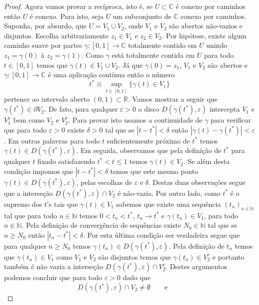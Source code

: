 \begin{proof}
\medskip 
Agora vamos provar a recíproca, isto é, se $U\subset \mathbb{C}$ é conexo 
por caminhos então $U$ é conexo. 
Para isto, seja $U$ um subconjunto de $\mathbb{C}$ conexo por caminhos.  
Suponha, por absurdo, que $U=V_1\cup V_2$, onde $V_1$ e $V_2$ são 
abertos não-vazios e disjuntos. Escolha arbitrariamente $z_1\in V_1$ e $z_2\in V_2$. 
Por hipótese, existe algum caminho suave por partes $\gamma:[0,1]\to\mathbb{C}$ totalmente
contido em $U$ unindo $z_1=\gamma(0)$ à $z_2=\gamma(1)$.
Como $\gamma$ está totalmente contida em $U$ para todo $t\in [0,1]$ temos que
$\gamma(t)\in V_1\cup V_2$. Já que $\gamma(0)=z_1$, $V_1$ e $V_2$ são abertos e $\gamma:[0,1]\to\mathbb{C}$
é uma aplicação contínua então 
o número 
\[ 
t^* \equiv \sup_{t\in [0,1]}\{ \gamma(t)\in V_1\}
\]
pertence ao intervalo aberto $(0,1)\subset\mathbb{R}$.
Vamos mostrar a seguir que $\gamma(t^*)\in \partial V_2$.
De fato, para qualquer $\varepsilon>0$ o disco $D(\gamma(t^*),\varepsilon)$
intercepta $V_1$ e $V_1^c$ bem como $V_2$ e $V_2^c$. Para provar isto  usamos a continuidade de 
$\gamma$ para verificar que para todo $\varepsilon>0$ existe $\delta>0$
tal que se $|t-t^{*}|<\delta$ então $|\gamma(t)-\gamma(t^*)|<\varepsilon$. Em outras palavras
para todo $t$ suficientemente próximo de $t^{*}$ temos $\gamma(t)\in D(\gamma(t^*),\varepsilon)$.
Em seguida, observamos que pela definição de $t^*$ para qualquer $t$ fixado satisfazendo
$t^{*}<t\leqslant 1$ temos $\gamma(t)\in V_2$. Se além desta condição impomos que 
$|t-t^{*}|<\delta$ temos que este mesmo ponto $\gamma(t)\in D(\gamma(t^*),\varepsilon)$, pelas 
escolhas de $\varepsilon$ e $\delta$. 
Destas duas observações segue que a interseção $D(\gamma(t^*),\varepsilon)\cap V_2$
é não-vazia. Por outro lado, como $t^{*}$ é o supremo dos $t$'s tais que $\gamma(t)\in V_1$
sabemos que existe uma sequência $(t_n)_{n\in\mathbb{N}}$ tal que para todo $n\in\mathbb{N}$ 
temos $0<t_n < t^*$, $t_n\to t^{*}$ e $\gamma(t_n)\in V_1$, para todo $n\in\mathbb{N}$.
Pela definição de convergência de sequências existe $N_0\in\mathbb{N}$ tal que se $n\geqslant N_0$
então $|t_n-t^{*}|<\delta$. Por esta última condição ser verdadeira segue que para qualquer $n\geqslant N_0$ temos
$\gamma(t_n)\in D(\gamma(t^*),\varepsilon)$. Pela definição de $t_n$ temos que $\gamma(t_n)\in V_1$
como $V_1$ e $V_2$ são disjuntos temos que $\gamma(t_n)\in V_2^c$ e portanto também é não vazia 
a interseção $D(\gamma(t^*),\varepsilon)\cap V_2^c$. Destes argumentos podemos concluir que
para todo $\varepsilon>0$ dado que 
\[
D(\gamma(t^*),\varepsilon)\cap V_2 \neq \emptyset 
\qquad\text{e}\qquad
\]
\end{proof}
